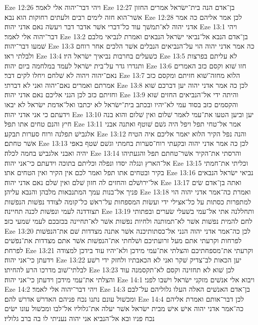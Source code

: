 Eze 12:26  ויהי דבר־יהוה אלי לאמר׃
Eze 12:27  בן־אדם הנה בית־ישׂראל אמרים החזון אשׁר־הוא חזה לימים רבים ולעתים רחוקות הוא נבא׃
Eze 12:28  לכן אמר אליהם כה אמר אדני יהוה לא־תמשׁך עוד כל־דברי אשׁר אדבר דבר ויעשׂה נאם אדני יהוה׃
Eze 13:1  ויהי דבר־יהוה אלי לאמר׃
Eze 13:2  בן־אדם הנבא אל־נביאי ישׂראל הנבאים ואמרת לנביאי מלבם שׁמעו דבר־יהוה׃
Eze 13:3  כה אמר אדני יהוה הוי על־הנביאים הנבלים אשׁר הלכים אחר רוחם ולבלתי ראו׃
Eze 13:4  כשׁעלים בחרבות נביאיך ישׂראל היו׃
Eze 13:5  לא עליתם בפרצות ותגדרו גדר על־בית ישׂראל לעמד במלחמה ביום יהוה׃
Eze 13:6  חזו שׁוא וקסם כזב האמרים נאם־יהוה ויהוה לא שׁלחם ויחלו לקים דבר׃
Eze 13:7  הלוא מחזה־שׁוא חזיתם ומקסם כזב אמרתם ואמרים נאם־יהוה ואני לא דברתי׃
Eze 13:8  לכן כה אמר אדני יהוה יען דברכם שׁוא וחזיתם כזב לכן הנני אליכם נאם אדני יהוה׃
Eze 13:9  והיתה ידי אל־הנביאים החזים שׁוא והקסמים כזב בסוד עמי לא־יהיו ובכתב בית־ישׂראל לא יכתבו ואל־אדמת ישׂראל לא יבאו וידעתם כי אני אדני יהוה׃
Eze 13:10  יען וביען הטעו את־עמי לאמר שׁלום ואין שׁלום והוא בנה חיץ והנם טחים אתו תפל׃
Eze 13:11  אמר אל־טחי תפל ויפל היה גשׁם שׁוטף ואתנה אבני אלגבישׁ תפלנה ורוח סערות תבקע׃
Eze 13:12  והנה נפל הקיר הלוא יאמר אליכם איה הטיח אשׁר טחתם׃
Eze 13:13  לכן כה אמר אדני יהוה ובקעתי רוח־סערות בחמתי וגשׁם שׁטף באפי יהיה ואבני אלגבישׁ בחמה לכלה׃
Eze 13:14  והרסתי את־הקיר אשׁר־טחתם תפל והגעתיהו אל־הארץ ונגלה יסדו ונפלה וכליתם בתוכה וידעתם כי־אני יהוה׃
Eze 13:15  וכליתי את־חמתי בקיר ובטחים אתו תפל ואמר לכם אין הקיר ואין הטחים אתו׃
Eze 13:16  נביאי ישׂראל הנבאים אל־ירושׁלם והחזים לה חזון שׁלם ואין שׁלם נאם אדני יהוה׃
Eze 13:17  ואתה בן־אדם שׂים פניך אל־בנות עמך המתנבאות מלבהן והנבא עליהן׃
Eze 13:18  ואמרת כה־אמר אדני יהוה הוי למתפרות כסתות על כל־אצילי ידי ועשׂות המספחות על־ראשׁ כל־קומה לצודד נפשׁות הנפשׁות תצודדנה לעמי ונפשׁות לכנה תחיינה׃
Eze 13:19  ותחללנה אתי אל־עמי בשׁעלי שׂערים ובפתותי לחם להמית נפשׁות אשׁר לא־תמותנה ולחיות נפשׁות אשׁר לא־תחיינה בכזבכם לעמי שׁמעי כזב׃
Eze 13:20  לכן כה־אמר אדני יהוה הנני אל־כסתותיכנה אשׁר אתנה מצדדות שׁם את־הנפשׁות לפרחות וקרעתי אתם מעל זרועתיכם ושׁלחתי את־הנפשׁות אשׁר אתם מצדדות את־נפשׁים לפרחת׃
Eze 13:21  וקרעתי את־מספחתיכם והצלתי את־עמי מידכן ולא־יהיו עוד בידכן למצודה וידעתן כי־אני יהוה׃
Eze 13:22  יען הכאות לב־צדיק שׁקר ואני לא הכאבתיו ולחזק ידי רשׁע לבלתי־שׁוב מדרכו הרע להחיתו׃
Eze 13:23  לכן שׁוא לא תחזינה וקסם לא־תקסמנה עוד והצלתי את־עמי מידכן וידעתן כי־אני יהוה׃
Eze 14:1  ויבוא אלי אנשׁים מזקני ישׂראל וישׁבו לפני׃
Eze 14:2  ויהי דבר־יהוה אלי לאמר׃
Eze 14:3  בן־אדם האנשׁים האלה העלו גלוליהם על־לבם ומכשׁול עונם נתנו נכח פניהם האדרשׁ אדרשׁ להם׃
Eze 14:4  לכן דבר־אותם ואמרת אליהם כה־אמר אדני יהוה אישׁ אישׁ מבית ישׂראל אשׁר יעלה את־גלוליו אל־לבו ומכשׁול עונו ישׂים נכח פניו ובא אל־הנביא אני יהוה נעניתי לו בה ברב גלוליו׃
